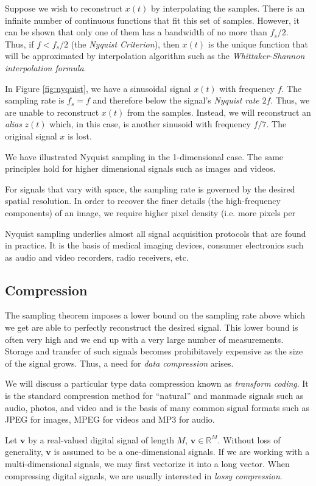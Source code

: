 Suppose we wish to reconstruct $x(t)$ by interpolating the samples.
There is an infinite number of continuous functions that fit this set of samples.
However, it can be shown that only one of them has a bandwidth of no more than $f_s/2$.
Thus, if $f < f_s/2$ (the \emph{Nyquist Criterion}), then $x(t)$ is the unique function that will be approximated by interpolation algorithm such as the \emph{Whittaker-Shannon interpolation formula}\cite{shannon1949}.

In Figure \ref{fig:nyquist}, we have a sinusoidal signal $x(t)$ with frequency $f$.
The sampling rate is $f_s=f$ and therefore below the signal's \emph{Nyquist rate} $2f$. 
Thus, we are unable to reconstruct $x(t)$ from the samples. 
Instead, we will reconstruct an \emph{alias} $z(t)$ which, in this case, is another sinusoid with frequency $f/7$.
The original signal $x$ is lost.

We have illustrated Nyquist sampling in the 1-dimensional case.
The same principles hold for higher dimensional signals such as images and videos.

For signals that vary with space, the sampling rate is governed by the desired spatial resolution.
In order to recover the finer details (the high-frequency components) of an image, we require higher pixel density (i.e. more pixels per 

Nyquist sampling underlies almost all signal acquisition protocols that are found in practice. 
It is the basis of medical imaging devices, consumer electronics such as audio and video recorders, radio receivers, etc.

\subsection{Compression}
The sampling theorem imposes a lower bound on the sampling rate above which we get are able to perfectly reconstruct the desired signal.
This lower bound is often very high and we end up with a very large number of measurements.
Storage and transfer of such signals becomes prohibitavely expensive as the size of the signal grows.
Thus, a need for \emph{data compression} arises.

We will discuss a particular type data compression known as \emph{transform coding}.
It is the standard compression method for ``natural'' and manmade signals such as audio, photos, and video and is the basis of many common signal formats such as JPEG for images, MPEG for videos and MP3 for audio.

Let $\bm v$ by a real-valued digital signal of length $M$, $\bm v \in \mathbb{R}^M$.
Without loss of generality, $\bm v$ is assumed to be a one-dimensional signals.
If we are working with a multi-dimensional signals, we may first vectorize it into a long vector.
When compressing digital signals, we are usually interested in \emph{lossy compression}.

